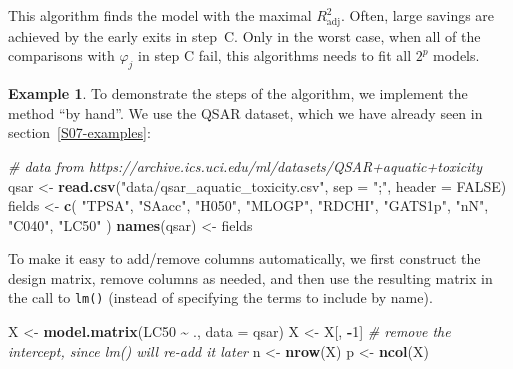 \documentclass[
  a4paper,
]{article}
\newenvironment{Shaded}{\begin{snugshade}}{\end{snugshade}}
\newcommand{\AttributeTok}[1]{\textcolor[rgb]{0.13,0.29,0.53}{#1}}
\newcommand{\CommentTok}[1]{\textcolor[rgb]{0.56,0.35,0.01}{\textit{#1}}}
\newcommand{\ConstantTok}[1]{\textcolor[rgb]{0.56,0.35,0.01}{#1}}
\newcommand{\DecValTok}[1]{\textcolor[rgb]{0.00,0.00,0.81}{#1}}
\newcommand{\FunctionTok}[1]{\textcolor[rgb]{0.13,0.29,0.53}{\textbf{#1}}}
\newcommand{\NormalTok}[1]{#1}
\newcommand{\OtherTok}[1]{\textcolor[rgb]{0.56,0.35,0.01}{#1}}
\newcommand{\SpecialCharTok}[1]{\textcolor[rgb]{0.81,0.36,0.00}{\textbf{#1}}}
\newcommand{\StringTok}[1]{\textcolor[rgb]{0.31,0.60,0.02}{#1}}
\theoremstyle{definition}
\theoremstyle{definition}
\newtheorem{example}{Example}[section]
\theoremstyle{definition}
\theoremstyle{definition}
\theoremstyle{remark}
\begin{document}
This algorithm finds the model with the maximal \(R^2_\mathrm{adj}\).
Often, large savings are achieved by the early exits in step~C.
Only in the worst case, when all of the comparisons with \(\varphi_j\) in step
C fail, this algorithms needs to fit all \(2^p\) models.

\begin{example}
\protect\hypertarget{exm:qsar-search}{}\label{exm:qsar-search}To demonstrate the steps of the algorithm, we implement the method
``by hand''. We use the QSAR dataset, which we have already seen
in section~\ref{S07-examples}:

\begin{Shaded}
\begin{Highlighting}[]
\CommentTok{\# data from https://archive.ics.uci.edu/ml/datasets/QSAR+aquatic+toxicity}
\NormalTok{qsar }\OtherTok{\textless{}{-}} \FunctionTok{read.csv}\NormalTok{(}\StringTok{"data/qsar\_aquatic\_toxicity.csv"}\NormalTok{,}
                 \AttributeTok{sep =} \StringTok{";"}\NormalTok{, }\AttributeTok{header =} \ConstantTok{FALSE}\NormalTok{)}
\NormalTok{fields }\OtherTok{\textless{}{-}} \FunctionTok{c}\NormalTok{(}
    \StringTok{"TPSA"}\NormalTok{,}
    \StringTok{"SAacc"}\NormalTok{,}
    \StringTok{"H050"}\NormalTok{,}
    \StringTok{"MLOGP"}\NormalTok{,}
    \StringTok{"RDCHI"}\NormalTok{,}
    \StringTok{"GATS1p"}\NormalTok{,}
    \StringTok{"nN"}\NormalTok{,}
    \StringTok{"C040"}\NormalTok{,}
    \StringTok{"LC50"}
\NormalTok{)}
\FunctionTok{names}\NormalTok{(qsar) }\OtherTok{\textless{}{-}}\NormalTok{ fields}
\end{Highlighting}
\end{Shaded}

To make it easy to add/remove columns automatically, we first construct
the design matrix, remove columns as needed, and then use the resulting
matrix in the call to \texttt{lm()} (instead of specifying the terms to include
by name).

\begin{Shaded}
\begin{Highlighting}[]
\NormalTok{X }\OtherTok{\textless{}{-}} \FunctionTok{model.matrix}\NormalTok{(LC50 }\SpecialCharTok{\textasciitilde{}}\NormalTok{ ., }\AttributeTok{data =}\NormalTok{ qsar)}
\NormalTok{X }\OtherTok{\textless{}{-}}\NormalTok{ X[, }\SpecialCharTok{{-}}\DecValTok{1}\NormalTok{] }\CommentTok{\# remove the intercept, since lm() will re{-}add it later}
\NormalTok{n }\OtherTok{\textless{}{-}} \FunctionTok{nrow}\NormalTok{(X)}
\NormalTok{p }\OtherTok{\textless{}{-}} \FunctionTok{ncol}\NormalTok{(X)}


\end{Highlighting}
\end{Shaded}
\end{example}
\end{document}
